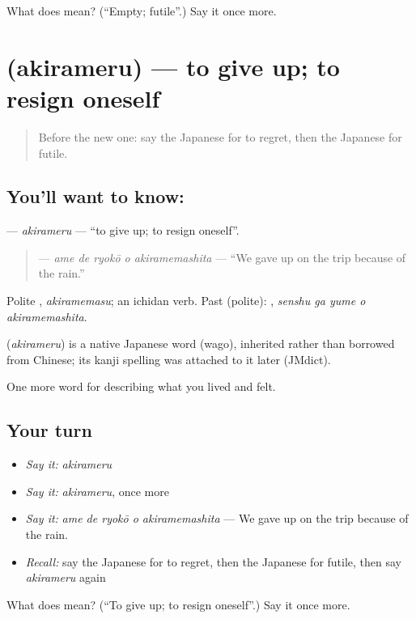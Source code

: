 \begin{tcolorbox}[breakable,colback=teal!4,colframe=teal!35!black,title={Before you move on}]
What does  mean? (\textquotedblleft{}Empty; futile\textquotedblright{}.) Say it once more.
\end{tcolorbox}
\section[\texorpdfstring{\ja{あきらめる} (akirameru)}{あきらめる (akirameru)}]{ (akirameru) — to give up; to resign oneself}

\label{lesson:JA-C432-akirameru}



\begin{quote}
Before the new one: say the Japanese for to regret, then the Japanese for futile.
\end{quote}

\subsection*{You'll want to know: }
\textbf{} — \emph{akirameru} — \textquotedblleft{}to give up; to resign oneself\textquotedblright{}.

\begin{quote}
\textbf{  } — \emph{ame de ryokō o akiramemashita} — \textquotedblleft{}We gave up on the trip because of the rain.\textquotedblright{}
\end{quote}

Polite \textbf{}, \emph{akiramemasu}; an ichidan verb. Past (polite): \textbf{  }, \emph{senshu ga yume o akiramemashita}.

\begin{cousinweb}
\textbf{} (\emph{akirameru}) is a native Japanese word (wago), inherited rather than borrowed from Chinese; its kanji spelling was attached to it later (JMdict).
\end{cousinweb}

\begin{grammarlens}[title={What you've built}]
One more word for describing what you lived and felt.
\end{grammarlens}

\subsection*{Your turn}
\begin{itemize}
\raggedright
  \item \emph{Say it:} \emph{akirameru}
  \item \emph{Say it:} \emph{akirameru}, once more
  \item \emph{Say it:} \emph{ame de ryokō o akiramemashita} — We gave up on the trip because of the rain.
  \item \emph{Recall:} say the Japanese for to regret, then the Japanese for futile, then say \emph{akirameru} again
\end{itemize}

\begin{tcolorbox}[breakable,colback=teal!4,colframe=teal!35!black,title={Before you move on}]
What does  mean? (\textquotedblleft{}To give up; to resign oneself\textquotedblright{}.) Say it once more.
\end{tcolorbox}
